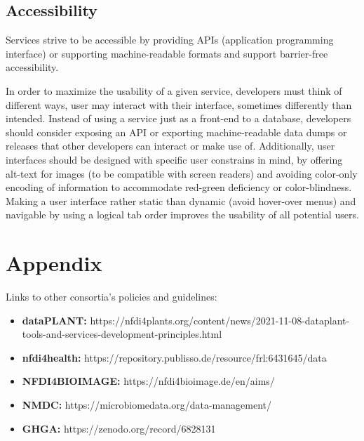 \documentclass[
  paper=a4,
  ,captions=tableheading
]{scrartcl}
\providecommand{\tightlist}{%
  \setlength{\itemsep}{0pt}\setlength{\parskip}{0pt}}
\renewenvironment{quote}{\begin{shaded*}\begin{em}}{\end{em}\end{shaded*}}
\renewenvironment{quote}{\begin{customblockquote}\list{}{\rightmargin=0em\leftmargin=0em}%
\item\relax\color{blockquote-text}\ignorespaces}{\unskip\unskip\endlist\end{customblockquote}}
\begin{document}
\hypertarget{accessibility}{%
\subsection{Accessibility}\label{accessibility}}

Services strive to be accessible by providing APIs (application
programming interface) or supporting machine-readable formats and
support barrier-free accessibility.

\begin{quote}
In order to maximize the usability of a given service, developers must
think of different ways, user may interact with their interface,
sometimes differently than intended. Instead of using a service just as
a front-end to a database, developers should consider exposing an API or
exporting machine-readable data dumps or releases that other developers
can interact or make use of. Additionally, user interfaces should be
designed with specific user constrains in mind, by offering alt-text for
images (to be compatible with screen readers) and avoiding color-only
encoding of information to accommodate red-green deficiency or
color-blindness. Making a user interface rather static than dynamic
(avoid hover-over menus) and navigable by using a logical tab order
improves the usability of all potential users.
\end{quote}

\hypertarget{appendix}{%
\section{Appendix}\label{appendix}}

Links to other consortia's policies and guidelines:

\begin{itemize}
\tightlist
\item
  \textbf{dataPLANT:}
  https://nfdi4plants.org/content/news/2021-11-08-dataplant-tools-and-services-development-principles.html
\item
  \textbf{nfdi4health:}
  https://repository.publisso.de/resource/frl:6431645/data
\item
  \textbf{NFDI4BIOIMAGE:} https://nfdi4bioimage.de/en/aims/
\item
  \textbf{NMDC:} https://microbiomedata.org/data-management/
\item
  \textbf{GHGA:} https://zenodo.org/record/6828131
\end{itemize}
\end{document}
